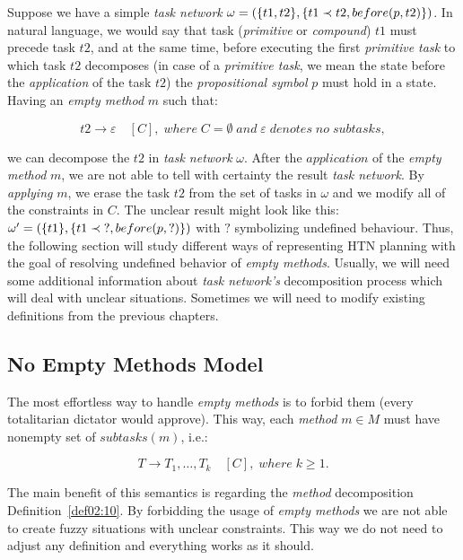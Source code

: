\begin{example}\label{ex03:6}
    Suppose we have a simple \emph{task network} $\omega = (\{t1, t2\}, \{t1 \prec t2, \\ before(p, t2)\})$. In natural language, we would say that task (\emph{primitive} or \emph{compound}) $t1$ must precede task $t2$, and at the same time, before executing the first \emph{primitive task} to which task $t2$ decomposes (in case of a \emph{primitive task}, we mean the state before the \emph{application} of the task $t2$) the \emph{propositional symbol} $p$ must hold in a state. Having an \emph{empty method} $m$ such that:
    
    \[
        t2 \rightarrow \varepsilon \quad [C], \; where \; C = \emptyset \; and \; \varepsilon \; denotes \; no \; subtasks,
    \]
    
    \noindent
    we can decompose the $t2$ in \emph{task network} $\omega$. After the $application$ of the \emph{empty method} $m$, we are not able to tell with certainty the result \emph{task network}. By \emph{applying} $m$, we erase the task $t2$ from the set of tasks in $\omega$ and we modify all of the constraints in $C$. The unclear result might look like this: $\omega' = (\{t1\}, \{t1 \prec \; ?, \\ before(p, ?)\})$ with $?$ symbolizing undefined behaviour. Thus, the following section will study different ways of representing HTN planning with the goal of resolving undefined behavior of \emph{empty methods}. Usually, we will need some additional information about \emph{task network's} decomposition process which will deal with unclear situations. Sometimes we will need to modify existing definitions from the previous chapters.
\end{example}

\subsection{No Empty Methods Model}\label{sub03:311}

\medskip\noindent
The most effortless way to handle \emph{empty methods} is to forbid them (every totalitarian dictator would approve). This way, each \emph{method} $m \in M$ must have nonempty set of $subtasks(m)$, i.e.:

\[
    T \rightarrow T_1,\dots,T_k \quad [C], \; where \; k \geq 1.
\]

\noindent
The main benefit of this semantics is regarding the \emph{method} decomposition Definition~\ref{def02:10}. By forbidding the usage of \emph{empty methods} we are not able to create fuzzy situations with unclear constraints. This way we do not need to adjust any definition and everything works as it should.

